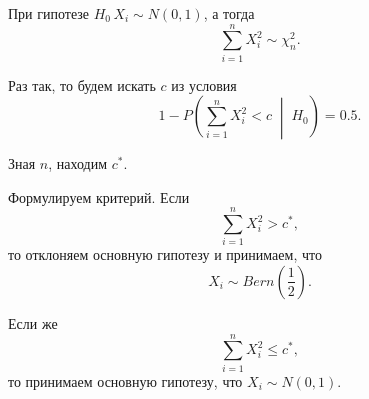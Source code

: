 При гипотезе $H_0 \, X_i \sim N \left( 0, 1 \right) $, а тогда
$$ \sum \limits_{i = 1}^n X_i^2 \sim
  \chi_n^2.$$

Раз так, то будем искать $c$ из условия
$$1 - P \left( \sum \limits_{i = 1}^n X_i^2 < c \; \middle| \; H_0 \right) =
  0.5.$$

Зная $n$, находим $c^*$.

Формулируем критерий.
Если
$$ \sum \limits_{i = 1}^n X_i^2 >
  c^*,$$
то отклоняем основную гипотезу и принимаем, что
$$X_i \sim
  Bern \left( \frac{1}{2} \right).$$

Если же
$$ \sum \limits_{i = 1}^n X_i^2 \leq
  c^*,$$
то принимаем основную гипотезу, что $X_i \sim N \left( 0, 1 \right) $.
